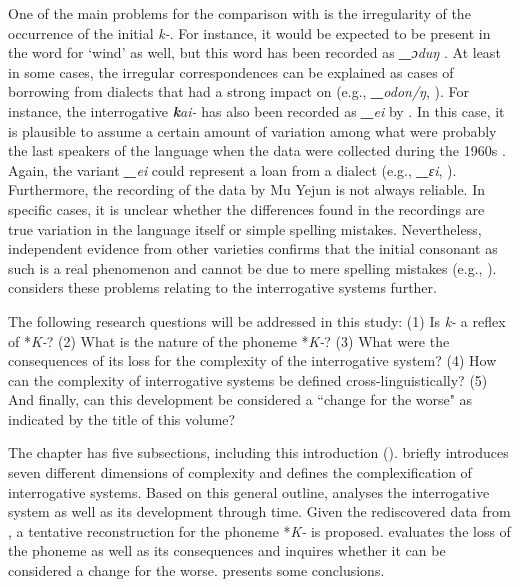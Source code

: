 \documentclass[output=paper,hidelinks]{langscibook}
\begin{document}
One of the main problems for the comparison with  is the irregularity of the occurrence of the initial \textit{k-}. For instance, it would be expected to be present in the word for `wind' as well, but this word has been recorded as \textit{\textbf{\_}ɔduŋ} \citep[6]{MuYejun1985}. At least in some cases, the irregular correspondences can be explained as cases of borrowing from  dialects that had a strong impact on  (e.g.,  \textit{\textbf{\_}odon/ŋ}, \citealt[162]{WangQingfeng2005}). For instance, the interrogative \textit{\textbf{k}ai-} has also been recorded as \textit{\textbf{\_}ei} by \citet[10]{MuYejun1986}. In this case, it is plausible to assume a certain amount of variation among what were probably the last speakers of the language when the data were collected during the 1960s \citep[5]{MuYejun1985}. Again, the variant \textit{\textbf{\_}ei} could represent a loan from a  dialect (e.g.,  \textit{\textbf{\_}ɛi}, \citealt[127]{ZhaoJie1989}). Furthermore, the recording of the  data by Mu Yejun is not always reliable. In specific cases, it is unclear whether the differences found in the recordings are true variation in the language itself or simple spelling mistakes. Nevertheless, independent evidence from other  varieties confirms that the initial consonant as such is a real phenomenon and cannot be due to mere spelling mistakes (e.g., \citealt{Kiyose2000}).  considers these problems relating to the  interrogative systems further.

The following research questions will be addressed in this study: (1) Is  \textit{k-} a reflex of  *\textit{K-}? (2) What is the nature of the  phoneme *\textit{K-}? (3) What were the consequences of its loss for the complexity of the  interrogative system? (4) How can the complexity of interrogative systems be defined cross-linguistically? (5) And finally, can this development be considered a ``change for the worse" as indicated by the title of this volume?

The chapter has five subsections, including this introduction ().  briefly introduces seven different dimensions of complexity and defines the complexification of interrogative systems. Based on this general outline,  analyses the  interrogative system as well as its development through time. Given the rediscovered data from , a tentative reconstruction for the  phoneme *\textit{K-} is proposed.  evaluates the loss of the phoneme as well as its consequences and inquires whether it can be considered a change for the worse.  presents some conclusions.
\end{document}
